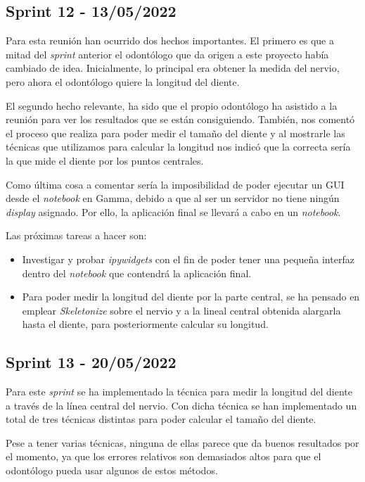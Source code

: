 \subsection{Sprint 12 - 13/05/2022}
Para esta reunión han ocurrido dos hechos importantes. El primero es que a mitad del \emph{sprint} anterior el odontólogo que da origen a este proyecto había cambiado de idea. Inicialmente, lo principal era obtener la medida del nervio, pero ahora el odontólogo quiere la longitud del diente.

El segundo hecho relevante, ha sido que el propio odontólogo ha asistido a la reunión para ver los resultados que se están consiguiendo. También, nos comentó el proceso que realiza para poder medir el tamaño del diente y al mostrarle las técnicas que utilizamos para calcular la longitud nos indicó que la correcta sería la que mide el diente por los puntos centrales.

Como última cosa a comentar sería la imposibilidad de poder ejecutar un GUI desde el \emph{notebook} en Gamma, debido a que al ser un servidor no tiene ningún \emph{display}
asignado. Por ello, la aplicación final se llevará a cabo en un \emph{notebook}.

Las próximas tareas a hacer son:
\begin{itemize}
    \item Investigar y probar \emph{ipywidgets} con el fin de poder tener una pequeña interfaz dentro del \emph{notebook} que contendrá la aplicación final.
    \item Para poder medir la longitud del diente por la parte central, se ha pensado en emplear \emph{Skeletonize} sobre el nervio y a la lineal central obtenida alargarla hasta el diente, para posteriormente calcular su longitud.
\end{itemize}

\subsection{Sprint 13 - 20/05/2022}
Para este \emph{sprint} se ha implementado la técnica para medir la longitud del diente a través de la línea central del nervio. Con dicha técnica se han implementado un total de tres técnicas distintas para poder calcular el tamaño del diente.

Pese a tener varias técnicas, ninguna de ellas parece que da buenos resultados por el momento, ya que los errores relativos son demasiados altos para que el odontólogo pueda usar algunos de estos métodos.

